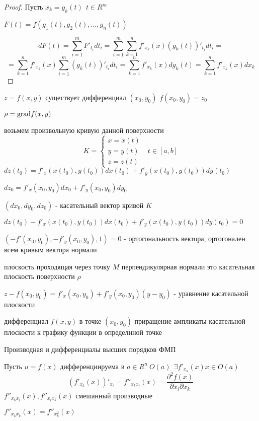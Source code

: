\begin{proof}
  Пусть $x_k = g_k(t) ~~ t \in R^m$

  $F(t) = f(g_1(t), g_2(t), \ldots, g_n(t))$

  $$
  dF(t) = \sum_{i=1}^m F'_{t_i}dt_i = \sum_{i=1}^m \sum_{k=1}^n
  f'_{x_k}(x) (g_k(t))'_{t_i}dt_i =
  $$
  $$
  = \sum_{k=1}^n f'_{x_k}(x) \sum_{i=1}^m (g_k(t))'_{t_i} dt_i =
  \sum_{k=1}^n f'_{x_k}(x)dg_k(t) = \sum_{k=1}^n f'_{x_k}(x) dx_k
  $$
\end{proof}

$z = f(x, y)$ существует дифференциал $(x_0, y_0)$ $f(x_0, y_0) = z_0$

$\rho = \mathrm{grad} f(x, y)$

возьмем произвольную кривую данной поверхности
$$
K = \left\{
\begin{array}{l}
  x = x(t) \\
  y = y(t) \\
  z = z(t)
\end{array}
\right. ~~~ t \in [a,b]
$$
$dz(t_0) = f'_x(x(t_0), y(t_0)) dx(t_0) + f'_y(x(t_0), y(t_0))dy(t_0)$

$dz_0 = f'_x (x_0, y_0)dx_0 + f'_y(x_0, y_0)dy_0$

$(dx_0, dy_0, dz_0)$ - касательный вектор кривой $K$

$dz(t_0) - f'_x(x(t_0), y(t_0)) dx(t_0) + f'_y(x(t_0), y(t_0))dy(t_0) = 0$

$(-f'(x_0, y_0), -f'_y(x_0, y_0), 1) = 0$ - ортогональность вектора,
ортогонален всем кривым вектора нормали

плоскость проходящая через точку $M$ перпендикулярная нормали это касательная
плоскость поверхности $\rho$

$z - f(x_0, y_0) = f'_x(x_0, y_0) + f'_y(x_0, y_0)(y - y_0)$ - уравнение
касательной плоскости

дифференциал $f(x,y)$ в точке $(x_0, y_0)$ приращение ампликаты касательной
плоскости к графику функции в определнной точке

\begin{title}[\Large]
  Производная и дифференциалы высших порядков ФМП
\end{title}

\begin{define}
  Пусть $u = f(x)$ дифференциируема в $a \in R^n ~ O(a) ~~ \exists f'_{x_k}(x)
  x \in O(a)$
  $$
  (f'_{x_k}(x))'_{x_i} = f''_{x_k x_i}(x) = \frac{\partial^2 f(x)}
  {\partial x_i \partial x_k}
  $$
  $f''_{x_k x_i}(x), f''_{x_i x_k}(x)$ смешанный производные

  $f''_{x_k x_k}(x) = f''_{x_k^2}(x)$
\end{define}


